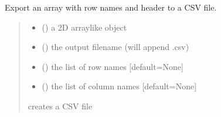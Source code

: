 \documentclass[letterpaper,12pt,english]{sphinxmanual}
\begin{document}
\begin{fulllineitems}
\label{\detokenize{api/core:cbmpy.CBTools.exportLabelledArrayWithHeader2CSV}}
\pysigstartsignatures
\pysiglinewithargsret
{}
{\sphinxparamcomma {}\sphinxparamcomma {}\sphinxparamcomma {}}
{}
\pysigstopsignatures
\sphinxAtStartPar
Export an array with row names and header to a CSV file.
\begin{quote}\begin{description}
\begin{itemize}
\item {} 
\sphinxAtStartPar
{} () \textendash{} a 2D array\sphinxhyphen{}like object

\item {} 
\sphinxAtStartPar
{} () \textendash{} the output filename (will append .csv)

\item {} 
\sphinxAtStartPar
{} (\sphinxstyleliteralemphasis{\sphinxupquote{, }}) \textendash{} the list of row names {[}default=None{]}

\item {} 
\sphinxAtStartPar
{} (\sphinxstyleliteralemphasis{\sphinxupquote{, }}) \textendash{} the list of column names {[}default=None{]}

\end{itemize}

\sphinxAtStartPar
{} \textendash{} creates a CSV file

\end{description}\end{quote}

\end{fulllineitems}
\end{document}
